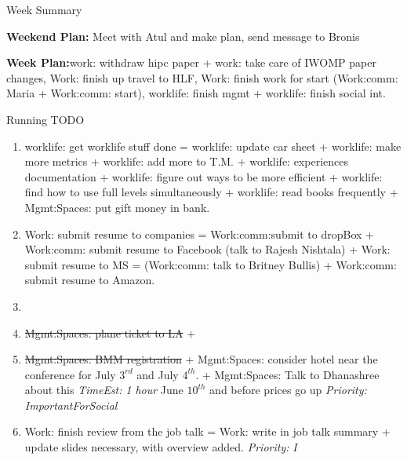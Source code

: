 \documentclass[serif, mathserif, final]{beamer}
\newcommand{\doneTask}[1]{\tiny \item \tiny \sout{#1}}
\newcommand{\te}[1]{\textit{TimeEst:} \textit{#1}}
\newcommand{\priority}[1]{\textit{Priority:} \textit{#1}}
\newcommand{\prio}[1]{\textit{Priority:} \textit{#1}}
\newcommand{\dl}[1]{#1}
\begin{document}
\begin{frame}{}
\begin{columns}
\begin{column}{0.50\linewidth}
\begin{block}{Week Summary}
        

          {\tiny \textbf{Weekend Plan:}  Meet with Atul and make plan,
            send message to Bronis }

          {\tiny \textbf{Week Plan:}work: withdraw hipc paper + work:
            take care of IWOMP paper changes, Work: finish up travel
            to HLF, Work: finish work for start (Work:comm: Maria +
            Work:comm: start), worklife: finish mgmt + worklife: finish social int. }  
      \end{block} 
      
      \begin{block}{Running TODO} %
        \begin{enumerate} 
        \item \small worklife: get worklife stuff done =  worklife:
          update car sheet + worklife: make more metrics + worklife:
          add more to T.M. + worklife: experiences documentation +
          worklife: figure out ways to be more efficient + worklife:
          find how to use full levels simultaneously + worklife: read
          books frequently + Mgmt:Spaces: put gift money in bank. 
          
        \item \small Work: submit resume to companies  =
          Work:comm:submit to dropBox + Work:comm: submit resume to
          Facebook (talk to Rajesh Nishtala) + Work: submit
          resume to MS = (Work:comm: talk to Britney Bullis) +
          Work:comm: submit resume to Amazon. 

        \item \small \doneTask{Mgmt:Spaces: plane ticket to LA}  + \doneTask{Mgmt:Spaces:
        BMM registration} + Mgmt:Spaces: consider hotel near the
        conference for July $3^{rd}$ and July $4^{th}$.  +
        Mgmt:Spaces: Talk to Dhanashree about this \te{1 hour}
        \dl{June $10^{th}$ and before prices go up}
        \prio{ImportantForSocial}

    \item \small Work: finish review from the job talk  = Work:
      write in job talk summary + update slides necessary, with
      overview added. \priority{I}


\end{enumerate}
\end{block}
\end{column}
\end{columns}
\end{frame}
\end{document}
